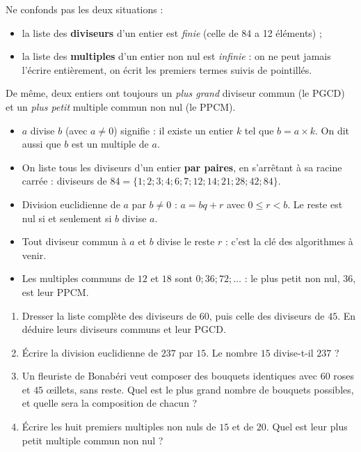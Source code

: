 \documentclass[11pt]{article}
\newcounter{popsec}
\newcounter{popsub}
\newcommand{\courssub}[1]{%
  \stepcounter{popsub}%
  \par\vspace{9pt}\noindent{\popxbold\fontsize{11.5}{13}\selectfont\color{popink}{\color{poporange}\thepopsec.\thepopsub}\hspace{6pt}#1}\par\nopagebreak\vspace{4pt}
}
\begin{document}
\begin{attention}
Ne confonds pas les deux situations :
\begin{itemize}
\item la liste des \textbf{diviseurs} d'un entier est \emph{finie} (celle de 84 a 12 éléments) ;
\item la liste des \textbf{multiples} d'un entier non nul est \emph{infinie} : on ne peut jamais l'écrire entièrement, on écrit les premiers termes suivis de pointillés.
\end{itemize}
De même, deux entiers ont toujours un \emph{plus grand} diviseur commun (le PGCD) et un \emph{plus petit} multiple commun non nul (le PPCM).
\end{attention}

\courssub{Bilan de la section}

\begin{aretenir}
\begin{itemize}
\item $a$ divise $b$ (avec $a \neq 0$) signifie : il existe un entier $k$ tel que $b = a \times k$. On dit aussi que $b$ est un multiple de $a$.
\item On liste tous les diviseurs d'un entier \textbf{par paires}, en s'arrêtant à sa racine carrée : diviseurs de $84 = \{1 ; 2 ; 3 ; 4 ; 6 ; 7 ; 12 ; 14 ; 21 ; 28 ; 42 ; 84\}$.
\item Division euclidienne de $a$ par $b \neq 0$ : $a = bq + r$ avec $0 \leq r < b$. Le reste est nul si et seulement si $b$ divise $a$.
\item Tout diviseur commun à $a$ et $b$ divise le reste $r$ : c'est la clé des algorithmes à venir.
\item Les multiples communs de $12$ et $18$ sont $0 ; 36 ; 72 ; \dots$ : le plus petit non nul, $36$, est leur PPCM.
\end{itemize}
\end{aretenir}

\begin{exercice}
\begin{enumerate}
\item Dresser la liste complète des diviseurs de $60$, puis celle des diviseurs de $45$. En déduire leurs diviseurs communs et leur PGCD.
\item Écrire la division euclidienne de $237$ par $15$. Le nombre $15$ divise-t-il $237$ ?
\item Un fleuriste de Bonabéri veut composer des bouquets identiques avec $60$ roses et $45$ œillets, sans reste. Quel est le plus grand nombre de bouquets possibles, et quelle sera la composition de chacun ?
\item Écrire les huit premiers multiples non nuls de $15$ et de $20$. Quel est leur plus petit multiple commun non nul ?
\end{enumerate}
\end{exercice}
\end{document}
